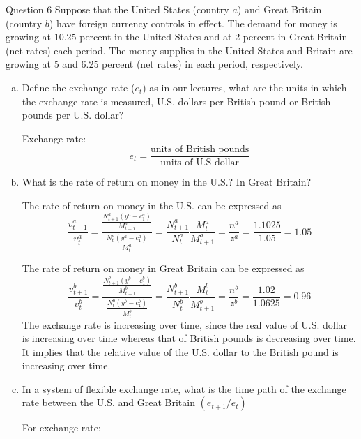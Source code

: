 \documentclass[a4paper]{article}
\newif\IfInSansMode
\numberwithin{equation}{section}
\numberwithin{figure}{section}
\begin{document}
	\begin{questionbox}{Question 6}
		Suppose that the United States (country \( a \)) and Great Britain (country \( b \)) have foreign currency controls in effect. The demand for money is growing at 10.25 percent in the United States and at 2 percent in Great Britain (net rates) each period. The money supplies in the United States and Britain are growing at 5 and 6.25 percent (net rates) in each period, respectively.
		\begin{enumerate}[(a)]
			\item Define the exchange rate (\( e_t \)) as in our lectures, what are the units in which the exchange rate is measured, U.S. dollars per British pound or British pounds per U.S. dollar?
			\begin{explanationbox}
				Exchange rate:
				\[
					e_t = \frac{\text{units of British pounds}}{\text{units of U.S dollar}}
				\]
			\end{explanationbox}
			\item What is the rate of return on money in the U.S.? In Great Britain?
			\begin{explanationbox}
				The rate of return on money in the U.S. can be expressed as
				\[
					\frac{v_{t+1}^a}{v_t^a} = \frac{\frac{N_{t+1}^a \left( y^a - c_1^a \right)}{M_{t+1}^a}}{\frac{N_t^a \left( y^a - c_1^a \right)}{M_t^a}} = \frac{N_{t+1}^a}{N_t^a}\frac{M_t^a}{M_{t+1}^a} = \frac{n^a}{z^a} = \frac{1.1025}{1.05} = 1.05
				\]
			\end{explanationbox}
			\begin{explanationbox}
				The rate of return on money in Great Britain can be expressed as
				\[
					\frac{v_{t+1}^b}{v_t^b} = \frac{\frac{N_{t+1}^b \left( y^b - c_1^b \right)}{M_{t+1}^b}}{\frac{N_t^b \left( y^b - c_1^b \right)}{M_t^b}} = \frac{N_{t+1}^b}{N_t^b}\frac{M_t^b}{M_{t+1}^b} = \frac{n^b}{z^b} = \frac{1.02}{1.0625} = 0.96
				\]
				The exchange rate is increasing over time, since the real value of U.S. dollar is increasing over time whereas that of British pounds is decreasing over time. It implies that the relative value of the U.S. dollar to the British pound is increasing over time.
			\end{explanationbox}
			\item In a system of flexible exchange rate, what is the time path of the exchange rate between the U.S. and Great Britain \( (e_{t+1}/e_t) \)
			\begin{explanationbox}
				For exchange rate:
				\begin{gather*}

\end{gather*}
\end{explanationbox}
\end{enumerate}
\end{questionbox}
\end{document}
